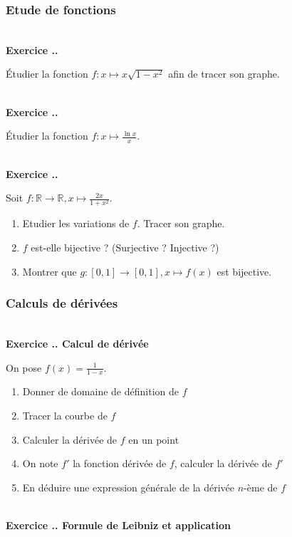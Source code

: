 \documentclass{article}
\newcommand{\mb}[1]{\mathbb{#1}}
\newcounter{exo}
\newcommand{\exercice}[1][\null]{\textbf{\\ Exercice \thesection.\theexo. #1} \addtocounter{exo}{1}}
\begin{document}
\subsubsection{Etude de fonctions}

\exercice 

Étudier la fonction $f : x \mapsto x \sqrt{1 - x^2}$
afin de tracer son graphe.

\exercice

Étudier la fonction $f : x \mapsto \frac{\ln x }{x}$.

\exercice 

Soit $f : \mb{R} \rightarrow \mb{R}, x \mapsto \frac{2x}{1+x^2}$.
\begin{enumerate}
\item Etudier les variations de $f$. Tracer son graphe.

\item $f$ est-elle bijective ? (Surjective ? Injective ?)

\item Montrer que $g : [0,1] \rightarrow [0,1], x \mapsto f(x)$ est bijective.
\end{enumerate}


\subsubsection{Calculs de dérivées}


\exercice[Calcul de dérivée]

On pose $f(x) = \frac{1}{1-x}$.

\begin{enumerate}
    \item Donner de domaine de définition de $f$
    \item Tracer la courbe de $f$
    \item Calculer la dérivée de $f$ en un point
    \item On note $f'$ la fonction dérivée de $f$,
        calculer la dérivée de $f'$
    \item En déduire une expression générale 
        de la dérivée $n$-ème de $f$
\end{enumerate}


\exercice[Formule de Leibniz et application]
\end{document}
